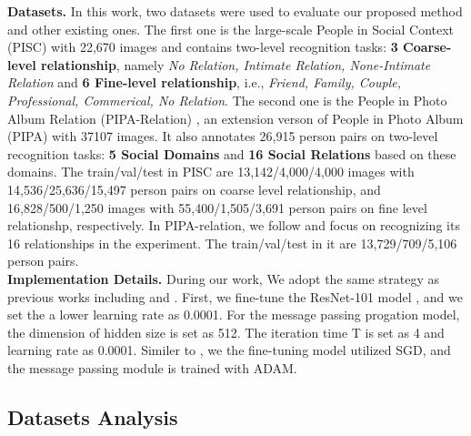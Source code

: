 \documentclass{article}
\begin{document}
{\bf Datasets.} In this work, two datasets were used to evaluate our proposed method and other existing ones. The first one is the large-scale People in Social Context (PISC) \cite{DBLP:conf/iccv/LiWZK17} with 22,670 images and contains two-level recognition tasks: {\bf 3 Coarse-level relationship}, namely {\it No Relation, Intimate Relation, None-Intimate Relation} and {\bf 6 Fine-level relationship}, i.e., {\it Friend, Family, Couple, Professional, Commerical, No Relation}. The second one is the People in Photo Album Relation (PIPA-Relation) \cite{DBLP:conf/cvpr/SunSF17}, an extension verson of People in Photo Album (PIPA) \cite{DBLP:conf/cvpr/ZhangPTFB15} with 37107 images. It also annotates 26,915 person pairs on two-level recognition tasks: {\bf 5 Social Domains} and {\bf 16 Social Relations} based on these domains. The train/val/test in PISC are 13,142/4,000/4,000 images with 14,536/25,636/15,497 person pairs on coarse level relationship, and 16,828/500/1,250 images with 55,400/1,505/3,691 person pairs on fine level relationshp, respectively. In PIPA-relation, we follow \cite{DBLP:conf/ijcai/WangCRYCL18} and focus on recognizing its 16 relationships in the experiment. The train/val/test in it are 13,729/709/5,106 person pairs. \\
{\bf Implementation Details.} During our work, We adopt the same strategy as previous works including \cite{DBLP:conf/iccv/LiWZK17} and \cite{DBLP:conf/ijcai/WangCRYCL18}. First, we fine-tune the ResNet-101 model \cite{DBLP:conf/cvpr/HeZRS16} , and we set the a lower learning rate as 0.0001. For the message passing progation model, the dimension of hidden size is set as 512. The iteration time T is set as 4 and learning rate as 0.0001. Similer to \cite{DBLP:conf/ijcai/WangCRYCL18}, we the fine-tuning model utilized SGD, and the message passing module is trained with ADAM.

\subsection{Datasets Analysis}
\end{document}

